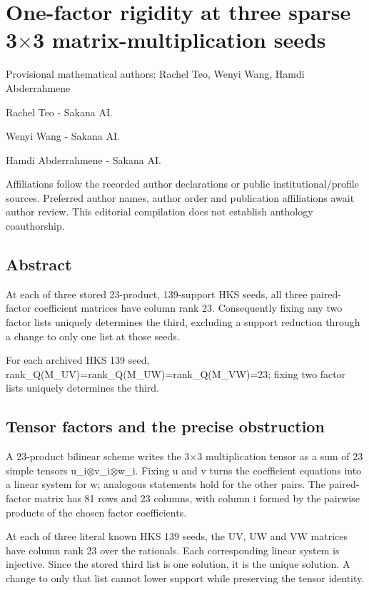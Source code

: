 \documentclass[11pt,a4paper]{article}
\begin{document}
\section{One-factor rigidity at three sparse 3\ensuremath{\times}3 matrix-multiplication seeds}
{\small Provisional mathematical authors: Rachel Teo, Wenyi Wang, Hamdi Abderrahmene\par}\medskip
{\small Rachel Teo  -  Sakana AI.\par}

{\small Wenyi Wang  -  Sakana AI.\par}

{\small Hamdi Abderrahmene  -  Sakana AI.\par}

{\small Affiliations follow the recorded author declarations or public institutional/profile sources. Preferred author names, author order and publication affiliations await author review. This editorial compilation does not establish anthology coauthorship.\par}

\subsection{Abstract}
At each of three stored 23-product, 139-support HKS seeds, all three paired-factor coefficient matrices have column rank 23. Consequently fixing any two factor lists uniquely determines the third, excluding a support reduction through a change to only one list at those seeds.

For each archived HKS 139 seed, rank\_Q(M\_UV)=rank\_Q(M\_UW)=rank\_Q(M\_VW)=23; fixing two factor lists uniquely determines the third.

\subsection{Tensor factors and the precise obstruction}
A 23-product bilinear scheme writes the 3\ensuremath{\times}3 multiplication tensor as a sum of 23 simple tensors u\_i\ensuremath{\otimes}v\_i\ensuremath{\otimes}w\_i. Fixing u and v turns the coefficient equations into a linear system for w; analogous statements hold for the other pairs. The paired-factor matrix has 81 rows and 23 columns, with column i formed by the pairwise products of the chosen factor coefficients.

At each of three literal known HKS 139 seeds, the UV, UW and VW matrices have column rank 23 over the rationals. Each corresponding linear system is injective. Since the stored third list is one solution, it is the unique solution. A change to only that list cannot lower support while preserving the tensor identity.
\end{document}
